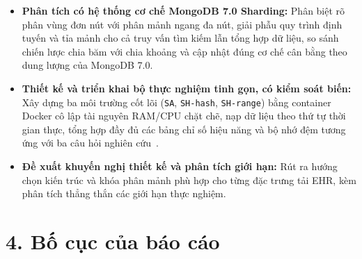 \begin{itemize}[leftmargin=0.8cm, itemsep=4pt]
  \item \textbf{Phân tích có hệ thống cơ chế MongoDB 7.0 Sharding:} Phân biệt rõ phân vùng đơn nút với phân mảnh ngang đa nút, giải phẫu quy trình định tuyến và tỉa mảnh cho cả truy vấn tìm kiếm lẫn tổng hợp dữ liệu, so sánh chiến lược chia băm với chia khoảng và cập nhật đúng cơ chế cân bằng theo dung lượng của MongoDB 7.0.
  \item \textbf{Thiết kế và triển khai bộ thực nghiệm tinh gọn, có kiểm soát biến:} Xây dựng ba môi trường cốt lõi (\texttt{SA}, \texttt{SH-hash}, \texttt{SH-range}) bằng container Docker cô lập tài nguyên RAM/CPU chặt chẽ, nạp dữ liệu theo thứ tự thời gian thực, tổng hợp đầy đủ các bảng chỉ số hiệu năng và bộ nhớ đệm tương ứng với ba câu hỏi nghiên cứu~\cite{ProjectRepo}.
  \item \textbf{Đề xuất khuyến nghị thiết kế và phân tích giới hạn:} Rút ra hướng chọn kiến trúc và khóa phân mảnh phù hợp cho từng đặc trưng tải EHR, kèm phân tích thẳng thắn các giới hạn thực nghiệm.
\end{itemize}

\section*{4. Bố cục của báo cáo}

